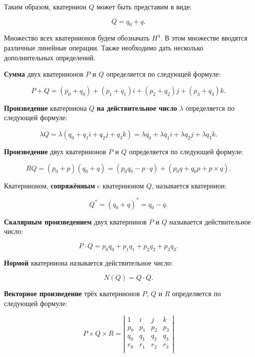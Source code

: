Таким образом, кватернион $Q$ может быть представим в виде:

$$
Q=q_0+q.
$$

Множество всех кватернионов будем обозначать $H^4$. В этом множестве вводятся различные линейные операции. Также
необходимо дать несколько дополнительных определений.

\begin{definition}
\textbf{Сумма} двух кватернионов $P$ и $Q$ определяется по следующей формуле:

$$
P+Q=(p_0+q_0)+(p_1+q_1)i+(p_2+q_2)j+(p_3+q_3)k.
$$
\end{definition}

\begin{definition}
\textbf{Произведение} кватерниона $Q$ \textbf{на действительное число} $\lambda$ определяется по следующей формуле:

$$
\lambda Q=\lambda(q_0+q_1i+q_2j+q_3k)=\lambda q_0+\lambda q_1i+\lambda q_2j+\lambda q_3k.
$$
\end{definition}

\begin{definition}
\textbf{Произведение} двух кватернионов $P$ и $Q$ определяется по следующей формуле:

$$
RQ=(p_0+p)(q_0+q)=(p_0q_0-p \cdot q)+(p_0q+q_0p+p\times q).
$$
\end{definition}

\begin{definition}
Кватернионом, \textbf{сопряжённым} c кватернионом $Q$, называется кватернион:

$$
Q^*=(q_0+q)^*=q_0-q.
$$
\end{definition}

\begin{definition}
\textbf{Скалярным произведением} двух кватернинов $P$ и $Q$ называется действительное число:

$$
P \cdot Q=p_0q_0+p_1q_1+p_2q_2+p_3q_3.
$$
\end{definition}

\begin{definition}
\textbf{Нормой} кватерниона называется действительное число:

$$
N(Q)=Q \cdot Q.
$$
\end{definition}

\begin{definition}
\textbf{Векторное произведение} трёх кватернионов $P$, $Q$ и $R$ определяется по следующей формуле:

$$
P \times Q \times R=
\left| { \begin{array}{cccc}
    1 & i & j & k \\
    p_0 & p_1 & p_2 & p_3 \\
    q_0 & q_1 & q_2 & q_3 \\
    r_0 & r_1 & r_2 & r_3 \\
\end{array} }\right|
$$
\end{definition}

